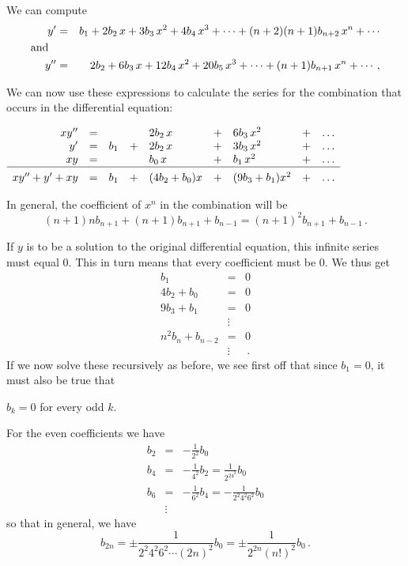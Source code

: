 {{{{We can compute
\begin{eqnarray*}
y'&=&b_1+2b_2\,x+3b_3\,x^2+4b_4\,x^3+\cdots +(n+2)(n+1)b_{n+2}\,x^n+\cdots \\
\mbox{and}\hspace{.1in}& & \\
y''&=&2b_2+6b_3\,x+12b_4\,x^2+20b_5\,x^3 +\cdots +(n+1)b_{n+1}\,x^n+\cdots\, ,
\end{eqnarray*}

We can now use these expressions to calculate the series for the combination that occurs in the differential equation: 

\medskip
$
\begin{array}{rclclclcl}
xy''&=& & &2b_2\,x&+&6b_3\,x^2&+&\ldots \\
y'&=&b_1 & +&2b_2\,x&+&3b_3\,x^2&+&\ldots \\
xy&=& &  &b_0\,x&+&b_1\,x^2&+&\ldots  \\ \hline
&&&&&&&& \\ [-8pt]
xy''+y'+xy&=&b_1&+&(4b_2+b_0 )x&+&(9b_3+b_1)x^2&+&\ldots
\end{array}
$ 

\medskip
\noindent
In general, 
the coefficient of $x^n$ in the combination will be 
\[
(n+1)nb_{n+1} + (n+1)b_{n+1} +b_{n-1} = (n+1)^2b_{n+1} +b_{n-1}\,.
\]

If $y$ is to be a solution to the original differential equation, this infinite series must equal 0. This in turn means that every coefficient must be 0.  We thus get\begin{eqnarray*}
b_1 &=&0 \\
4b_2+b_0  &=&0 \\
9b_3+b_1 &=&0 \\
&\vdots& \\
n^2b_n +b_{n-2}&=&0 \\
&\vdots& \, .
\end{eqnarray*}
If we now solve these recursively as before, we see first off that since $b_1=0$, it must also be true that
\begin{center}
$b_k=0$ for every odd $k$.
\end{center}
 For the even coefficients we have
\begin{eqnarray*}
b_2&=&-\frac{1}{2^2}b_0 \\
b_4&=&-\frac{1}{4^2}b_2= \frac{1}{2^24^2}b_0\\
b_6&=&-\frac{1}{6^2}b_4=-\frac{1}{2^2 4^2 6^2}b_0 \\
&\vdots& 
\end{eqnarray*}
so that in general, we have
\[
b_{2n}=\pm \frac{1}{2^2 4^2 6^2 \cdots (2n)^2}b_0= \pm \frac{1}{2^{2n} (n!)^2}b_0 \, .
\]


}}}}
